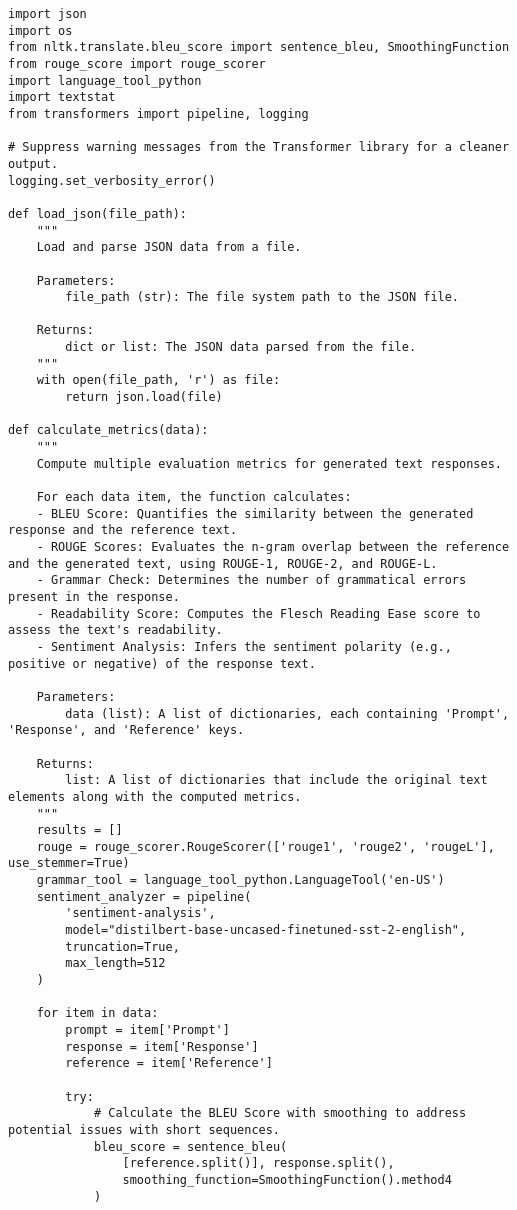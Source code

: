 \begin{lstlisting}[style=Python, caption={Python-data-preperation-for-analysis}, captionpos=b]
import json
import os
from nltk.translate.bleu_score import sentence_bleu, SmoothingFunction
from rouge_score import rouge_scorer
import language_tool_python
import textstat
from transformers import pipeline, logging

# Suppress warning messages from the Transformer library for a cleaner output.
logging.set_verbosity_error()

def load_json(file_path):
    """
    Load and parse JSON data from a file.

    Parameters:
        file_path (str): The file system path to the JSON file.

    Returns:
        dict or list: The JSON data parsed from the file.
    """
    with open(file_path, 'r') as file:
        return json.load(file)

def calculate_metrics(data):
    """
    Compute multiple evaluation metrics for generated text responses.

    For each data item, the function calculates:
    - BLEU Score: Quantifies the similarity between the generated response and the reference text.
    - ROUGE Scores: Evaluates the n-gram overlap between the reference and the generated text, using ROUGE-1, ROUGE-2, and ROUGE-L.
    - Grammar Check: Determines the number of grammatical errors present in the response.
    - Readability Score: Computes the Flesch Reading Ease score to assess the text's readability.
    - Sentiment Analysis: Infers the sentiment polarity (e.g., positive or negative) of the response text.

    Parameters:
        data (list): A list of dictionaries, each containing 'Prompt', 'Response', and 'Reference' keys.

    Returns:
        list: A list of dictionaries that include the original text elements along with the computed metrics.
    """
    results = []
    rouge = rouge_scorer.RougeScorer(['rouge1', 'rouge2', 'rougeL'], use_stemmer=True)
    grammar_tool = language_tool_python.LanguageTool('en-US')
    sentiment_analyzer = pipeline(
        'sentiment-analysis', 
        model="distilbert-base-uncased-finetuned-sst-2-english",
        truncation=True,
        max_length=512
    )

    for item in data:
        prompt = item['Prompt']
        response = item['Response']
        reference = item['Reference']

        try:
            # Calculate the BLEU Score with smoothing to address potential issues with short sequences.
            bleu_score = sentence_bleu(
                [reference.split()], response.split(), 
                smoothing_function=SmoothingFunction().method4
            )


\end{lstlisting}

